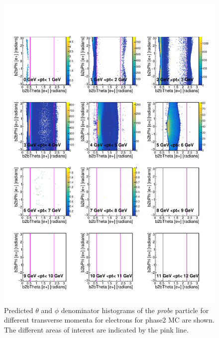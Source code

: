 \documentclass[a4paper,11pt,twosided,final,german,openbib,pdftex,listof=totoc,bibliography=totoc]{scrbook}
\begin{document}
\begin{appendix}
\begin{figure}[h!]
	\includegraphics[width=\textwidth]{Plots/RTPtMemD_MC.pdf}
	\caption[Denominator $\theta$-$\phi$ Electron Transverse Momentum Phase2 MC]{Predicted $\theta$ and $\phi$ denominator histograms of the \textit{probe} particle for different transverse momenta for electrons for phase2 MC are shown. The different areas of interest are indicated by the pink line.}
	\label{plt:RTPtMemD_MC}
\end{figure}




\end{appendix}
\end{document}
